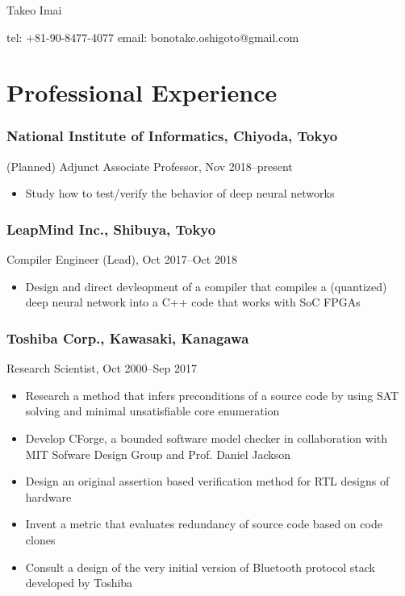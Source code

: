 \documentclass[a4paper,8pt]{report}
\begin{document}
\begin{center}
{\huge Takeo Imai}
\end{center}
{\footnotesize 
\begin{center}
tel: +81-90-8477-4077 \hspace{1em} email: bonotake.oshigoto@gmail.com\\
\end{center}
}

\section*{Professional Experience}
\subsubsection*{National Institute of Informatics, Chiyoda, Tokyo}
(Planned) Adjunct Associate Professor, Nov 2018--present
\begin{itemize}
    \item Study how to test/verify the behavior of deep neural networks
\end{itemize}

\subsubsection*{LeapMind Inc., Shibuya, Tokyo}
Compiler Engineer (Lead), Oct 2017--Oct 2018
\begin{itemize}
    \item Design and direct devleopment of a compiler that compiles a (quantized) deep neural network into a C++ code that works with SoC FPGAs
\end{itemize}

\subsubsection*{Toshiba Corp., Kawasaki, Kanagawa}
Research Scientist, Oct 2000--Sep 2017
\begin{itemize}
    \item Research a method that infers preconditions of a source code by using SAT solving and minimal unsatisfiable core enumeration
    \item Develop CForge, a bounded software model checker in collaboration with MIT Sofware Design Group and Prof. Daniel Jackson
    \item Design an original assertion based verification method for RTL designs of hardware
    \item Invent a metric that evaluates redundancy of source code based on code clones
    \item Consult a design of the very initial version of Bluetooth protocol stack developed by Toshiba
\end{itemize}
\end{document}
